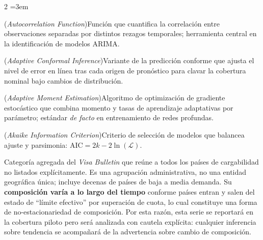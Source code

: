 \documentclass[12pt,letterpaper]{report}
\begin{document}
\begin{multicols}{2}
\setlength{\columnsep}{14pt}
\scriptsize
\sloppy   %
\emergencystretch=3em  %
\begin{description}[leftmargin=0pt, labelindent=0pt, itemindent=0pt,
                    labelsep=0.4em, font=\bfseries\scriptsize,
                    itemsep=2pt, parsep=0pt, topsep=0pt]
    \item[ACF] (\textit{Autocorrelation Function})\hspace{0.3em}Función que cuantifica la correlación entre observaciones separadas por distintos rezagos temporales; herramienta central en la identificación de modelos ARIMA.

    \item[ACI] (\textit{Adaptive Conformal Inference})\hspace{0.3em}Variante de la predicción conforme que ajusta el nivel de error en línea tras cada origen de pronóstico para clavar la cobertura nominal bajo cambios de distribución.

    \item[Adam] (\textit{Adaptive Moment Estimation})\hspace{0.3em}Algoritmo de optimización de gradiente estocástico que combina momento y tasas de aprendizaje adaptativas por parámetro; estándar \textit{de facto} en entrenamiento de redes profundas.

    \item[AIC] (\textit{Akaike Information Criterion})\hspace{0.3em}Criterio de selección de modelos que balancea ajuste y parsimonia: $\text{AIC} = 2k - 2\ln(\mathcal{L})$.

    \item[All Chargeability Areas Except Those Listed] Categoría agregada del \textit{Visa Bulletin} que reúne a todos los países de cargabilidad no listados explícitamente. Es una agrupación administrativa, no una entidad geográfica única; incluye decenas de países de baja a media demanda. Su \textbf{composición varía a lo largo del tiempo} conforme países entran y salen del estado de ``límite efectivo'' por superación de cuota, lo cual constituye una forma de no-estacionariedad de composición. Por esta razón, esta serie se reportará en la cobertura piloto pero será analizada con cautela explícita: cualquier inferencia sobre tendencia se acompañará de la advertencia sobre cambio de composición.


\end{description}
\end{multicols}
\end{document}
